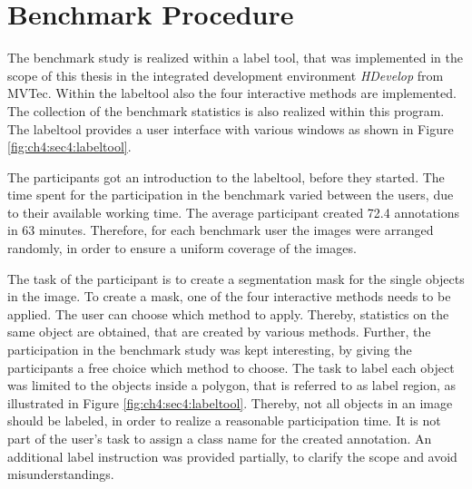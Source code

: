 
\section{Benchmark Procedure}\label{ord:ch4:sec5}
% 
The benchmark study is realized within a label tool, that was implemented in the scope of this thesis in the integrated development environment \textit{HDevelop} from MVTec.
Within the labeltool also the four interactive methods are implemented.
The collection of the benchmark statistics is also realized within this program.
The labeltool provides a user interface with various windows as shown in Figure \ref{fig:ch4:sec4:labeltool}.

The participants got an introduction to the labeltool, before they started.
The time spent for the participation in the benchmark varied between the users, due to their available working time. %
The average participant created 72.4 annotations in 63 minutes.
Therefore, for each benchmark user the images were arranged randomly, in order to ensure a uniform coverage of the images.

The task of the participant is to create a segmentation mask for the single objects in the image.
To create a mask, one of the four interactive methods needs to be applied.
The user can choose which method to apply.
Thereby, statistics on the same object are obtained, that are created by various methods.
Further, the participation in the benchmark study was kept interesting, by giving the participants a free choice which method to choose.
The task to label each object was limited to the objects inside a polygon, that is referred to as label region, as illustrated in Figure \ref{fig:ch4:sec4:labeltool}.
Thereby, not all objects in an image should be labeled, in order to realize a reasonable participation time.
It is not part of the user's task to assign a class name for the created annotation.
An additional label instruction was provided partially, to clarify the scope and avoid misunderstandings.

